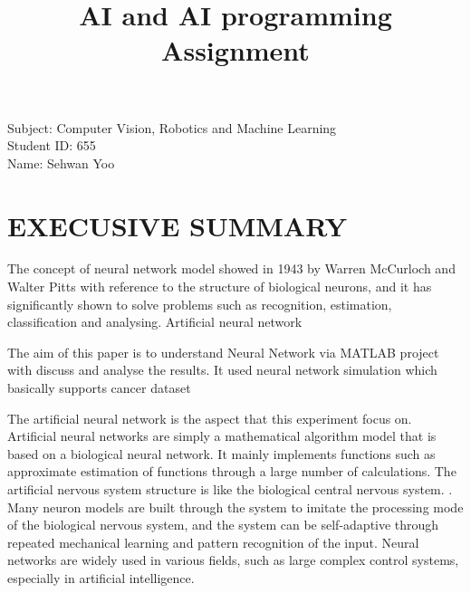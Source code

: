 \documentclass[a4paper, 12pt]{report}
\title{AI and AI programming Assignment}\\
\begin{document}
\maketitle
\begin{flushright}
  Subject: Computer Vision, Robotics and Machine Learning\\
  Student ID: 655\\
  Name: Sehwan Yoo
\end{flushright}
\cleardoublepage

\section*{EXECUSIVE SUMMARY}
  The concept of neural network model showed in 1943 by Warren McCurloch and Walter Pitts with reference to the structure of biological neurons, and it has significantly shown to solve problems such as recognition, estimation, classification and analysing. Artificial neural network 
  
  The aim of this paper is to understand Neural Network via MATLAB project with discuss and analyse the results. It used neural network simulation which basically supports cancer dataset 
  
The artificial neural network is the aspect that this experiment
focus on. Artificial neural networks are simply a mathematical algorithm model that is
based on a biological neural network. It mainly implements functions such as
approximate estimation of functions through a large number of calculations. The
artificial nervous system structure is like the biological central nervous system. . Many
neuron models are built through the system to imitate the processing mode of the
biological nervous system, and the system can be self-adaptive through repeated
mechanical learning and pattern recognition of the input. Neural networks are widely
used in various fields, such as large complex control systems, especially in artificial
intelligence.
\end{document}
